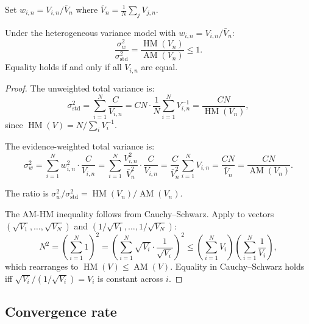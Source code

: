 Set $w_{i,n} = V_{i,n}/\bar{V}_n$ where $\bar{V}_n = \frac{1}{N}\sum_j V_{j,n}$.

\begin{theorem}
\label{thm:am-hm-ch3}
Under the heterogeneous variance model with $w_{i,n} = V_{i,n}/\bar{V}_n$:
\begin{equation}
\label{eq:am-hm-ch3}
\boxed{
    \frac{\sigma_w^2}{\sigma_{\mathrm{std}}^2} = \frac{\operatorname{HM}(V_n)}{\operatorname{AM}(V_n)} \leq 1.
}
\end{equation}
Equality holds if and only if all $V_{i,n}$ are equal.
\end{theorem}

\begin{proof}
The unweighted total variance is:
\begin{equation}
\label{eq:var-std-ch3}
    \sigma_{\mathrm{std}}^2 = \sum_{i=1}^N \frac{C}{V_{i,n}} = CN \cdot \frac{1}{N}\sum_{i=1}^N V_{i,n}^{-1} = \frac{CN}{\operatorname{HM}(V_n)},
\end{equation}
since $\operatorname{HM}(V) = N / \sum_i V_i^{-1}$.

The evidence-weighted total variance is:
\begin{equation}
\label{eq:var-w-ch3}
    \sigma_w^2 = \sum_{i=1}^N w_{i,n}^2 \cdot \frac{C}{V_{i,n}} = \sum_{i=1}^N \frac{V_{i,n}^2}{\bar{V}_n^2} \cdot \frac{C}{V_{i,n}} = \frac{C}{\bar{V}_n^2} \sum_{i=1}^N V_{i,n} = \frac{CN}{\bar{V}_n} = \frac{CN}{\operatorname{AM}(V_n)}.
\end{equation}

The ratio is $\sigma_w^2 / \sigma_{\mathrm{std}}^2 = \operatorname{HM}(V_n) / \operatorname{AM}(V_n)$.

The AM-HM inequality follows from Cauchy--Schwarz. Apply to vectors $(\sqrt{V_1}, \ldots, \sqrt{V_N})$ and $(1/\sqrt{V_1}, \ldots, 1/\sqrt{V_N})$:
\[
    N^2 = \left(\sum_{i=1}^N 1\right)^2 = \left(\sum_{i=1}^N \sqrt{V_i} \cdot \frac{1}{\sqrt{V_i}}\right)^2 \leq \left(\sum_{i=1}^N V_i\right)\left(\sum_{i=1}^N \frac{1}{V_i}\right),
\]
which rearranges to $\operatorname{HM}(V) \leq \operatorname{AM}(V)$. Equality in Cauchy--Schwarz holds iff $\sqrt{V_i} / (1/\sqrt{V_i}) = V_i$ is constant across $i$.
\end{proof}


\subsection{Convergence rate}


